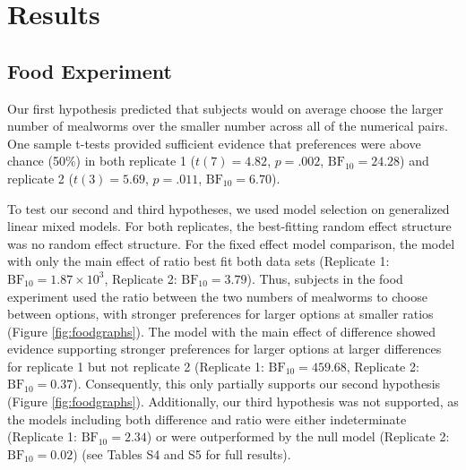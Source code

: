 \documentclass[
  ,doc,floatsintext]{apa6}
\begin{document}
\hypertarget{results}{%
\section{Results}\label{results}}

\hypertarget{food-experiment-1}{%
\subsection{Food Experiment}\label{food-experiment-1}}

Our first hypothesis predicted that subjects would on average choose the larger number of mealworms over the smaller number across all of the numerical pairs. One sample t-tests provided sufficient evidence that preferences were above chance (50\%) in both replicate 1 (\(t(7) = 4.82\), \(p = .002\), \(\mathrm{BF}_{\textrm{10}} = 24.28\)) and replicate 2 (\(t(3) = 5.69\), \(p = .011\), \(\mathrm{BF}_{\textrm{10}} = 6.70\)).

To test our second and third hypotheses, we used model selection on generalized linear mixed models. For both replicates, the best-fitting random effect structure was no random effect structure. For the fixed effect model comparison, the model with only the main effect of ratio best fit both data sets (Replicate 1: \(\mathrm{BF}_{\textrm{10}} = 1.87 \times 10^{3}\), Replicate 2: \(\mathrm{BF}_{\textrm{10}} = 3.79\)). Thus, subjects in the food experiment used the ratio between the two numbers of mealworms to choose between options, with stronger preferences for larger options at smaller ratios (Figure \ref{fig:foodgraphs}). The model with the main effect of difference showed evidence supporting stronger preferences for larger options at larger differences for replicate 1 but not replicate 2 (Replicate 1: \(\mathrm{BF}_{\textrm{10}} = 459.68\), Replicate 2: \(\mathrm{BF}_{\textrm{10}} = 0.37\)). Consequently, this only partially supports our second hypothesis (Figure \ref{fig:foodgraphs}). Additionally, our third hypothesis was not supported, as the models including both difference and ratio were either indeterminate (Replicate 1: \(\mathrm{BF}_{\textrm{10}} = 2.34\)) or were outperformed by the null model (Replicate 2: \(\mathrm{BF}_{\textrm{10}} = 0.02\)) (see Tables S4 and S5 for full results).
\end{document}
